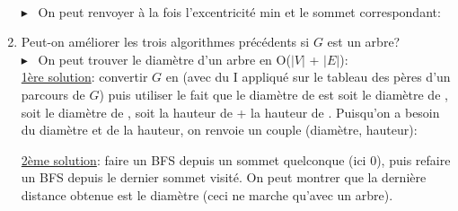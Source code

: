 \documentclass[mp2i]{exam}
\begin{document}
\begin{enumerate}
		\if{}
		\\$\blacktriangleright$~ On peut renvoyer à la fois l'excentricité min et le sommet correspondant:
		\begin{center}
		\end{center}
		\fi 
		\item Peut-on améliorer les trois algorithmes précédents si $G$ est un arbre?
		\if{}
		\\$\blacktriangleright$~ On peut trouver le diamètre d'un arbre en O($\vert V \vert$ + $\vert E \vert$): \\
		\underline{1ère solution}: convertir $G$ en  (avec  du I appliqué sur le tableau des pères d'un parcours de $G$) puis utiliser le fait que le diamètre de  est soit le diamètre de , soit le diamètre de , soit la hauteur de  + la hauteur de . Puisqu'on a besoin du diamètre et de la hauteur, on renvoie un couple (diamètre, hauteur):
		\begin{center}
		\end{center}
		\underline{2ème solution}: faire un BFS depuis un sommet quelconque (ici 0), puis refaire un BFS depuis le dernier sommet visité. On peut montrer que la dernière distance obtenue est le diamètre (ceci ne marche qu'avec un arbre).
		\begin{center}

\end{center}
\end{enumerate}
\end{document}

